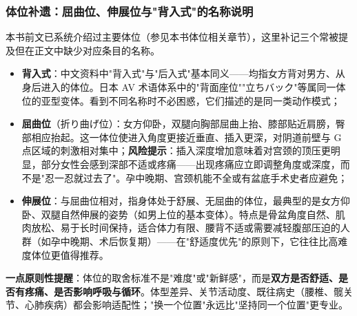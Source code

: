 \subsubsection{体位补遗：屈曲位、伸展位与"背入式"的名称说明}

本书前文已系统介绍过主要体位（参见本书体位相关章节），这里补记三个常被提及但在正文中缺少对应条目的名称。

\begin{itemize}
\item \textbf{背入式}：中文资料中"背入式"与"后入式"基本同义——均指女方背对男方、从身后进入的体位。日本 AV 术语体系中的"背面座位""立ちバック"等属同一体位的亚型变体。看到不同名称时不必困惑，它们描述的是同一类动作模式；
\item \textbf{屈曲位}（折り曲げ位）：女方仰卧，双腿向胸部屈曲上抬、膝部贴近肩膀，臀部相应抬起。这一体位使进入角度更接近垂直、插入更深，对阴道前壁与 G 点区域的刺激相对集中；\textbf{风险提示}：插入深度增加意味着对宫颈的顶压更明显，部分女性会感到深部不适或疼痛——出现疼痛应立即调整角度或深度，而不是"忍一忍就过去了"。孕中晚期、宫颈机能不全或有盆底手术史者应避免；
\item \textbf{伸展位}：与屈曲位相对，指身体处于舒展、无屈曲的体位，最典型的是女方仰卧、双腿自然伸展的姿势（如男上位的基本变体）。特点是骨盆角度自然、肌肉放松、易于长时间保持，适合体力有限、腰背不适或需要减轻腹部压迫的人群（如孕中晚期、术后恢复期）——在"舒适度优先"的原则下，它往往比高难度体位更值得推荐。
\end{itemize}

\noindent\textbf{一点原则性提醒}：体位的取舍标准不是"难度"或"新鲜感"，而是\textbf{双方是否舒适、是否有疼痛、是否影响呼吸与循环}。体型差异、关节活动度、既往病史（腰椎、髋关节、心肺疾病）都会影响适配性；"换一个位置"永远比"坚持同一个位置"更专业。
